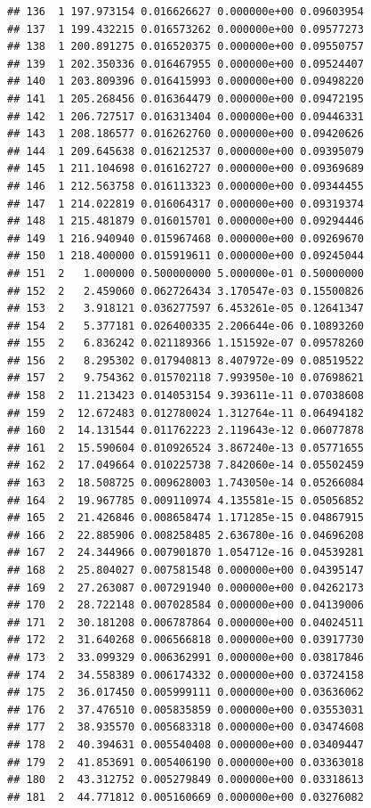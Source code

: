 \documentclass[article]{jss}\usepackage[]{graphicx}\usepackage[]{xcolor}
\makeatletter
\newenvironment{kframe}{%
 \def\at@end@of@kframe{}%
 \ifinner\ifhmode%
  \def\at@end@of@kframe{\end{minipage}}%
  \begin{minipage}{\columnwidth}%
 \fi\fi%
 \def\FrameCommand##1{\hskip\@totalleftmargin \hskip-\fboxsep
 \colorbox{shadecolor}{##1}\hskip-\fboxsep
     \hskip-\linewidth \hskip-\@totalleftmargin \hskip\columnwidth}%
 \MakeFramed {\advance\hsize-\width
   \@totalleftmargin\z@ \linewidth\hsize
   \@setminipage}}%
 {\par\unskip\endMakeFramed%
 \at@end@of@kframe}
\newenvironment{knitrout}{}{} %
\makeatother
\begin{document}
\begin{knitrout}
\begin{kframe}
\begin{verbatim}
## 136  1 197.973154 0.016626627 0.000000e+00 0.09603954
## 137  1 199.432215 0.016573262 0.000000e+00 0.09577273
## 138  1 200.891275 0.016520375 0.000000e+00 0.09550757
## 139  1 202.350336 0.016467955 0.000000e+00 0.09524407
## 140  1 203.809396 0.016415993 0.000000e+00 0.09498220
## 141  1 205.268456 0.016364479 0.000000e+00 0.09472195
## 142  1 206.727517 0.016313404 0.000000e+00 0.09446331
## 143  1 208.186577 0.016262760 0.000000e+00 0.09420626
## 144  1 209.645638 0.016212537 0.000000e+00 0.09395079
## 145  1 211.104698 0.016162727 0.000000e+00 0.09369689
## 146  1 212.563758 0.016113323 0.000000e+00 0.09344455
## 147  1 214.022819 0.016064317 0.000000e+00 0.09319374
## 148  1 215.481879 0.016015701 0.000000e+00 0.09294446
## 149  1 216.940940 0.015967468 0.000000e+00 0.09269670
## 150  1 218.400000 0.015919611 0.000000e+00 0.09245044
## 151  2   1.000000 0.500000000 5.000000e-01 0.50000000
## 152  2   2.459060 0.062726434 3.170547e-03 0.15500826
## 153  2   3.918121 0.036277597 6.453261e-05 0.12641347
## 154  2   5.377181 0.026400335 2.206644e-06 0.10893260
## 155  2   6.836242 0.021189366 1.151592e-07 0.09578260
## 156  2   8.295302 0.017940813 8.407972e-09 0.08519522
## 157  2   9.754362 0.015702118 7.993950e-10 0.07698621
## 158  2  11.213423 0.014053154 9.393611e-11 0.07038608
## 159  2  12.672483 0.012780024 1.312764e-11 0.06494182
## 160  2  14.131544 0.011762223 2.119643e-12 0.06077878
## 161  2  15.590604 0.010926524 3.867240e-13 0.05771655
## 162  2  17.049664 0.010225738 7.842060e-14 0.05502459
## 163  2  18.508725 0.009628003 1.743050e-14 0.05266084
## 164  2  19.967785 0.009110974 4.135581e-15 0.05056852
## 165  2  21.426846 0.008658474 1.171285e-15 0.04867915
## 166  2  22.885906 0.008258485 2.636780e-16 0.04696208
## 167  2  24.344966 0.007901870 1.054712e-16 0.04539281
## 168  2  25.804027 0.007581548 0.000000e+00 0.04395147
## 169  2  27.263087 0.007291940 0.000000e+00 0.04262173
## 170  2  28.722148 0.007028584 0.000000e+00 0.04139006
## 171  2  30.181208 0.006787864 0.000000e+00 0.04024511
## 172  2  31.640268 0.006566818 0.000000e+00 0.03917730
## 173  2  33.099329 0.006362991 0.000000e+00 0.03817846
## 174  2  34.558389 0.006174332 0.000000e+00 0.03724158
## 175  2  36.017450 0.005999111 0.000000e+00 0.03636062
## 176  2  37.476510 0.005835859 0.000000e+00 0.03553031
## 177  2  38.935570 0.005683318 0.000000e+00 0.03474608
## 178  2  40.394631 0.005540408 0.000000e+00 0.03409447
## 179  2  41.853691 0.005406190 0.000000e+00 0.03363018
## 180  2  43.312752 0.005279849 0.000000e+00 0.03318613
## 181  2  44.771812 0.005160669 0.000000e+00 0.03276082

\end{verbatim}
\end{kframe}
\end{knitrout}
\end{document}
